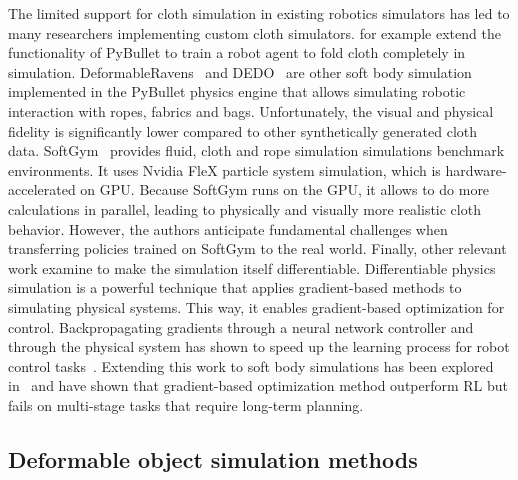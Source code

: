 \documentclass[\home/main.tex]{subfiles}
\begin{document}
The limited support for cloth simulation in existing robotics simulators has led to many researchers implementing custom cloth simulators. \textcite{Matas2018} for example extend the functionality of PyBullet to train a robot agent to fold cloth completely in simulation. DeformableRavens~\autocite{seita2021learning} and DEDO~\autocite{dedo} are other soft body simulation implemented in the PyBullet physics engine that allows simulating robotic interaction with ropes, fabrics and bags. Unfortunately, the visual and physical fidelity is significantly lower compared to other synthetically generated cloth data. SoftGym~\autocite{softgym} provides fluid, cloth and rope simulation simulations benchmark environments. It uses Nvidia FleX particle system simulation, which is hardware-accelerated on GPU. Because SoftGym runs on the GPU, it allows to do more calculations in parallel, leading to physically and visually more realistic cloth behavior. However, the authors anticipate fundamental challenges when transferring policies trained on SoftGym to the real world. Finally, other relevant work examine to make the simulation itself differentiable. Differentiable physics simulation is a powerful technique that applies gradient-based methods to simulating physical systems. This way, it enables gradient-based optimization for control. Backpropagating gradients through a neural network controller and through the physical system has shown to speed up the learning process for robot control tasks~\autocite{Degrave2019}. Extending this work to soft body simulations has been explored in~\autocite{liang2019differentiable,huang2021plasticinelab} and have shown that gradient-based optimization method outperform RL but fails on multi-stage tasks that require long-term planning.

\subsection{Deformable object simulation methods} \label{subsec:lit_cloth_sim}
\end{document}
